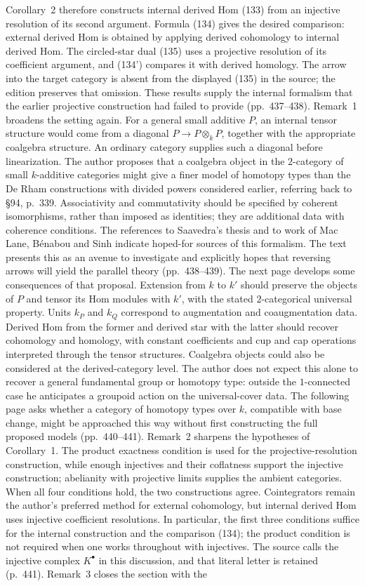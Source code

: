 \documentclass[10pt,oneside]{book}
\begin{document}
Corollary~2 therefore constructs internal derived Hom (133) from an injective resolution of its second argument. Formula (134) gives the desired comparison: external derived Hom is obtained by applying derived cohomology to internal derived Hom. The circled-star dual (135) uses a projective resolution of its coefficient argument, and (134') compares it with derived homology. The arrow into the target category is absent from the displayed (135) in the source; the edition preserves that omission. These results supply the internal formalism that the earlier projective construction had failed to provide (pp.\ 437--438). Remark~1 broadens the setting again. For a general small additive $P$, an internal tensor structure would come from a diagonal $P\to P\otimes_k P$, together with the appropriate coalgebra structure. An ordinary category supplies such a diagonal before linearization. The author proposes that a coalgebra object in the $2$-category of small $k$-additive categories might give a finer model of homotopy types than the De Rham constructions with divided powers considered earlier, referring back to \S94, p.\ 339. Associativity and commutativity should be specified by coherent isomorphisms, rather than imposed as identities; they are additional data with coherence conditions. The references to Saavedra's thesis and to work of Mac Lane, Bénabou and Sinh indicate hoped-for sources of this formalism. The text presents this as an avenue to investigate and explicitly hopes that reversing arrows will yield the parallel theory (pp.\ 438--439). The next page develops some consequences of that proposal. Extension from $k$ to $k'$ should preserve the objects of $P$ and tensor its Hom modules with $k'$, with the stated $2$-categorical universal property. Units $k_P$ and $k_Q$ correspond to augmentation and coaugmentation data. Derived Hom from the former and derived star with the latter should recover cohomology and homology, with constant coefficients and cup and cap operations interpreted through the tensor structures. Coalgebra objects could also be considered at the derived-category level. The author does not expect this alone to recover a general fundamental group or homotopy type: outside the $1$-connected case he anticipates a groupoid action on the universal-cover data. The following page asks whether a category of homotopy types over $k$, compatible with base change, might be approached this way without first constructing the full proposed models (pp.\ 440--441). Remark~2 sharpens the hypotheses of Corollary~1. The product exactness condition is used for the projective-resolution construction, while enough injectives and their coflatness support the injective construction; abelianity with projective limits supplies the ambient categories. When all four conditions hold, the two constructions agree. Cointegrators remain the author's preferred method for external cohomology, but internal derived Hom uses injective coefficient resolutions. In particular, the first three conditions suffice for the internal construction and the comparison (134); the product condition is not required when one works throughout with injectives. The source calls the injective complex $K^\bullet$ in this discussion, and that literal letter is retained (p.\ 441). Remark~3 closes the section with the 
\end{document}
